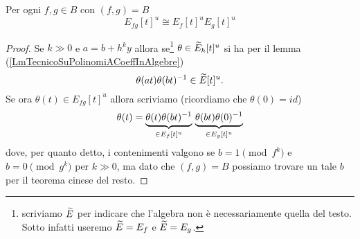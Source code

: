 \begin{lemma}\label{LmSpezzoLocalizzazioniDiPolinomiACoefficientiInAlgebre}
Per ogni $f,g\in B$ con $(f,g)=B$
	\[E_{fg}[t]^u\cong E_f[t]^u E_g[t]^u\]
\end{lemma}
\begin{proof}
Se $k\gg0$ e $a=b+h^ky$ allora se\footnote{scriviamo $\widetilde{E}$ per indicare che l'algebra non \`e necessariamente quella del testo. Sotto infatti useremo $\widetilde{E}=E_f$ e $\widetilde{E}=E_g$.} $\theta\in \widetilde{E}_h[t]^u$ si ha per il lemma (\ref{LmTecnicoSuPolinomiACoeffInAlgebre})
\[\theta(at)\theta(bt)^{-1}\in \widetilde{E}[t]^u.\]
Se ora $\theta(t)\in E_{fg}[t]^u$ allora scriviamo (ricordiamo che $\theta(0)=id$)
\[\theta(t)=\underset{\in E_f[t]^u}{\underbrace{\theta(t)\theta(bt)^{-1}}}\ \underset{\in E_g[t]^u}{\underbrace{\theta(bt)\theta(0)^{-1}}}\]
dove, per quanto detto, i contenimenti valgono se $b=1\pmod{f^k}$ e $b=0\pmod{g^k}$ per $k\gg0$, ma dato che $(f,g)=B$ possiamo trovare un tale $b$ per il teorema cinese del resto.
\end{proof}


